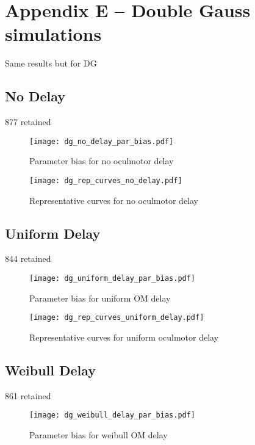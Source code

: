 \section*{Appendix E -- Double Gauss simulations}



Same results but for DG

\subsection{No Delay}

877 retained


\begin{figure}[H]
\centering
\texttt{[image: dg\_no\_delay\_par\_bias.pdf]}
\caption{Parameter bias for no oculmotor delay}
\label{fig:dg_par_bias_no_delay}
\end{figure}

\begin{figure}[H]
\centering
\texttt{[image: dg\_rep\_curves\_no\_delay.pdf]}
\caption{Representative curves for no oculmotor delay}
\label{fig:dg_rep_curves_no_delay}
\end{figure}


\subsection{Uniform Delay}

844 retained


\begin{figure}[H]
\centering
\texttt{[image: dg\_uniform\_delay\_par\_bias.pdf]}
\caption{Parameter bias for uniform OM delay}
\label{fig:dg_par_bias_uniform_delay}
\end{figure}

\begin{figure}[H]
\centering
\texttt{[image: dg\_rep\_curves\_uniform\_delay.pdf]}
\caption{Representative curves for uniform oculmotor delay}
\label{fig:dg_rep_curves_uniform_delay}
\end{figure}

\subsection{Weibull Delay}

861 retained

\begin{figure}[H]
\centering
\texttt{[image: dg\_weibull\_delay\_par\_bias.pdf]}
\caption{Parameter bias for weibull OM delay}
\label{fig:dg_par_bias_weibull_delay}
\end{figure}

